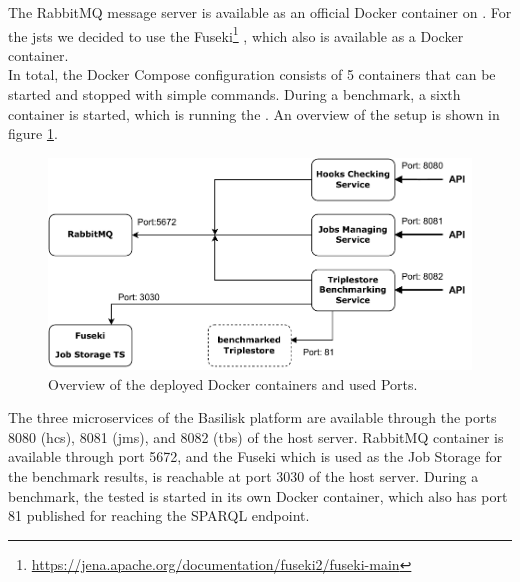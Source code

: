 The RabbitMQ message server is available as an official Docker container on \dockh{}.
For the \ac{jsts} we decided to use the Fuseki\footnote{\url{https://jena.apache.org/documentation/fuseki2/fuseki-main}} \ts{}, which also is available as a Docker container.
\\

In total, the Docker Compose configuration consists of 5 containers that can be started and stopped with simple commands.
During a benchmark, a sixth container is started, which is running the \ts{}.
An overview of the setup is shown in figure \ref{fig:docker-setup}. 

\begin{figure}[tbph]
	\centering
	\includegraphics[width=.7\textwidth]{figures/docker-setup.pdf}
	\caption{Overview of the deployed Docker containers and used Ports.}
	\label{fig:docker-setup}
\end{figure}

The three microservices of the Basilisk platform are available through the ports 8080 (\ac{hcs}), 8081 (\ac{jms}), and 8082 (\ac{tbs}) of the host server.
RabbitMQ container is available through port 5672, and the Fuseki \ts{} which is used as the Job Storage for the benchmark results, is reachable at port 3030 of the host server.
During a benchmark, the tested \ts{} is started in its own Docker container, which also has port 81 published for reaching the SPARQL endpoint.